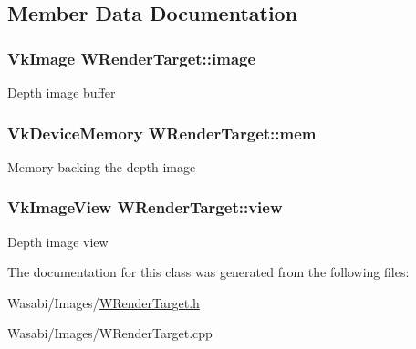 \subsection{Member Data Documentation}
\subsubsection[{\texorpdfstring{image}{image}}]{\setlength{\rightskip}{0pt plus 5cm}Vk\+Image W\+Render\+Target\+::image}\hypertarget{class_w_render_target_a6e26c20bd2f97f3ad456f3569e9f158a}{}\label{class_w_render_target_a6e26c20bd2f97f3ad456f3569e9f158a}
Depth image buffer 
\subsubsection[{\texorpdfstring{mem}{mem}}]{\setlength{\rightskip}{0pt plus 5cm}Vk\+Device\+Memory W\+Render\+Target\+::mem}\hypertarget{class_w_render_target_abe198c49d2a4cc260ce6af8b978546cc}{}\label{class_w_render_target_abe198c49d2a4cc260ce6af8b978546cc}
Memory backing the depth image 
\subsubsection[{\texorpdfstring{view}{view}}]{\setlength{\rightskip}{0pt plus 5cm}Vk\+Image\+View W\+Render\+Target\+::view}\hypertarget{class_w_render_target_a0739084d5d75bd1afa99c2ead6fef02e}{}\label{class_w_render_target_a0739084d5d75bd1afa99c2ead6fef02e}
Depth image view 

The documentation for this class was generated from the following files\+:\begin{DoxyCompactItemize}
\item 
Wasabi/\+Images/\hyperlink{_w_render_target_8h}{W\+Render\+Target.\+h}\item 
Wasabi/\+Images/W\+Render\+Target.\+cpp\end{DoxyCompactItemize}

